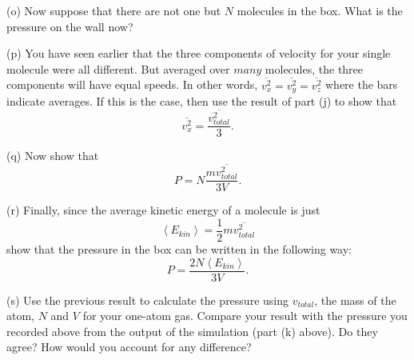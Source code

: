 (o) Now suppose that there are not one but $N$ molecules in the box. What
is the pressure on the wall now?
\answerspace{20mm}

(p) You have seen earlier that the three components of velocity for your single molecule were all different.  But averaged over $many$ molecules, the three components will have equal speeds.  In other words,  $\overline{v_{x}^{2}}=\overline{v_{y}^{2}}=\overline{v_{z}^{2}}$ where the bars indicate averages. If this is the case, then use the result of part (j) to show that
\[
\overline{v_{x}^{2}}=\frac{\overline{v_{total}^{2}}}{3}.\]


(q) Now show that 
\[
P=N\frac{m\overline{v_{total}^{2}}}{3V}.\]

\answerspace{20mm}

(r) Finally, since the average kinetic energy of a molecule is just
\[
\left<E_{kin}\right>=\frac{1}{2}m\overline{v_{total}^{2}}\]
show that the pressure in the box can be written in the following
way:
\[
P=\frac{2N\left<E_{kin}\right>}{3V}.\]
\answerspace{20mm}

(s) Use the previous result to calculate the pressure using $v_{total}$, the mass of the atom, $N$ and $V$ for your one-atom gas. Compare your result with the pressure you recorded above from the output of the simulation (part (k) above).
Do they agree? How would you account for any difference?
\answerspace{20mm}
